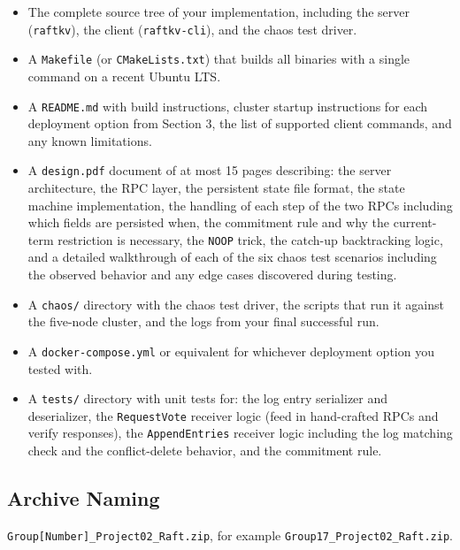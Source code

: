 \documentclass[11pt,a4paper]{article}
\begin{document}
\begin{itemize}
\item The complete source tree of your implementation, including the server (\texttt{raftkv}), the client (\texttt{raftkv-cli}), and the chaos test driver.

\item A \texttt{Makefile} (or \texttt{CMakeLists.txt}) that builds all binaries with a single command on a recent Ubuntu LTS.

\item A \texttt{README.md} with build instructions, cluster startup instructions for each deployment option from Section 3, the list of supported client commands, and any known limitations.

\item A \texttt{design.pdf} document of at most 15 pages describing: the server architecture, the RPC layer, the persistent state file format, the state machine implementation, the handling of each step of the two RPCs including which fields are persisted when, the commitment rule and why the current-term restriction is necessary, the \texttt{NOOP} trick, the catch-up backtracking logic, and a detailed walkthrough of each of the six chaos test scenarios including the observed behavior and any edge cases discovered during testing.

\item A \texttt{chaos/} directory with the chaos test driver, the scripts that run it against the five-node cluster, and the logs from your final successful run.

\item A \texttt{docker-compose.yml} or equivalent for whichever deployment option you tested with.

\item A \texttt{tests/} directory with unit tests for: the log entry serializer and deserializer, the \texttt{RequestVote} receiver logic (feed in hand-crafted RPCs and verify responses), the \texttt{AppendEntries} receiver logic including the log matching check and the conflict-delete behavior, and the commitment rule.
\end{itemize}

\subsection{Archive Naming}
\texttt{Group[Number]\_Project02\_Raft.zip}, for example \texttt{Group17\_Project02\_Raft.zip}.
\end{document}
